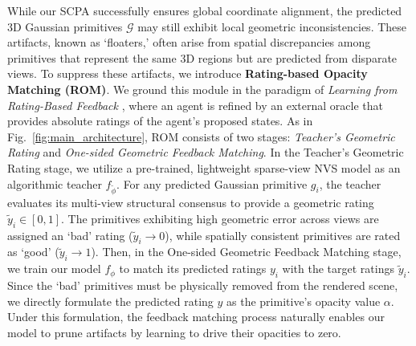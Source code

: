 While our SCPA successfully ensures global coordinate alignment, the predicted 3D Gaussian primitives $\mathcal{G}$ may still exhibit local geometric inconsistencies. 
These artifacts, known as `floaters,' often arise from spatial discrepancies among primitives that represent the same 3D regions but are predicted from disparate views. 
To suppress these artifacts, we introduce \textbf{Rating-based Opacity Matching (ROM)}. 
We ground this module in the paradigm of \textit{Learning from Rating-Based Feedback} \cite{arumugam2019deep, white2024rating, 10.5555/3305890.3305917}, where an agent is refined by an external oracle that provides absolute ratings of the agent's proposed states. 
As in Fig.~\ref{fig:main_architecture}, ROM consists of two stages: \textit{Teacher's Geometric Rating} and \textit{One-sided Geometric Feedback Matching}. 
In the Teacher's Geometric Rating stage, we utilize a pre-trained, lightweight sparse-view NVS model \cite{xu2025depthsplat} as an algorithmic teacher $f_{\tilde{\phi}}$. 
For any predicted Gaussian primitive $g_i$, the teacher evaluates its multi-view structural consensus to provide a geometric rating $\tilde{y}_i \in [0, 1]$. 
The primitives exhibiting high geometric error across views are assigned an `bad' rating ($\tilde{y}_i\to0$), while spatially consistent primitives are rated as `good' ($\tilde{y}_i\to1$). 
Then, in the One-sided Geometric Feedback Matching stage, we train our model $f_{\phi}$ to match its predicted ratings $y_i$ with the target ratings $\tilde{y}_i$. 
Since the `bad' primitives must be physically removed from the rendered scene, we directly formulate the predicted rating $y$ as the primitive's opacity value $\alpha$. 
Under this formulation, the feedback matching process naturally enables our model to prune artifacts by learning to drive their opacities to zero.

